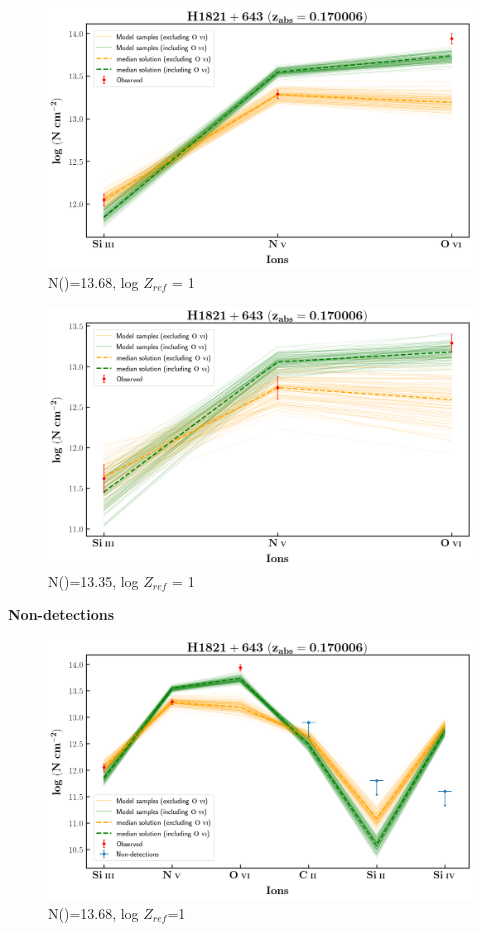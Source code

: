 \documentclass[12pt,draft]{report}
\newcommand\ion[2]{\text{#1\,\textsc{\lowercase{#2}}}}
\begin{document}
\newpage

\begin{figure}[!h]
    \centering
    \includegraphics[width=0.85\linewidth]{Ionisation-Modelling-Plots/h1821-z=0.170006-compII.png}
    \caption{N(\ion{H}{i})=13.68, log $Z_{ref}$ = 1}
\end{figure}

\begin{figure}[!b]
    \centering
    \includegraphics[width=0.85\linewidth]{Ionisation-Modelling-Plots/h1821-z=0.170006-compIII.png}
    \caption{N(\ion{H}{i})=13.35, log $Z_{ref}$ = 1}
\end{figure}


\newpage

\textbf{Non-detections}

\begin{figure}[!h]
    \centering
    \includegraphics[width=0.85\linewidth]{Ionisation-Modelling-Plots/h1821-z=0.170006-compII_logZ=1_non_detection.png}
    \caption{N(\ion{H}{i})=13.68, log $Z_{ref}$=1}
\end{figure}
\end{document}
